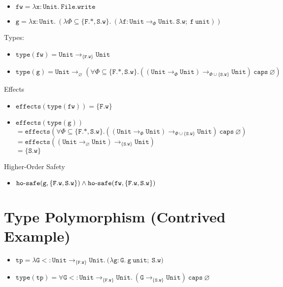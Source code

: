 \documentclass{llncs}
\newcommand{\keywadj}[1]{\mathtt{#1}}
\newcommand{\keyw}[1]{\keywadj{#1}~}
\newcommand{\kw}[1]{\keyw{ #1 }}
\newcommand{\kwa}[1]{\keywadj{ #1 }}
\newcommand{\hyphen}{\hbox{-}}
\newcommand{\Unit}[0]{ \kwa{Unit} }
\newcommand{\fx}[1]{ \kwa{effects}(#1) }
\newcommand{\hosafe}[2]{ \kwa{ho \hyphen safe}(#1, #2) }
\begin{document}
\begin{itemize}
	\item $\kwa{fw = \lambda x: Unit.~File.write}$
	\item $\kwa{g = \lambda x: Unit.~ (\lambda \Phi \subseteq \{F.*, S.w \}.~(\lambda f: Unit \rightarrow_{\Phi} Unit.~S.w;~f~unit))}$
\end{itemize}

\noindent
Types:
\begin{itemize}
	\item $\kwa{type(fw) = \Unit \rightarrow_{\{F.w\}} \Unit}$
	\item $\kwa{type(g) = Unit \rightarrow_{\varnothing} (\forall \Phi \subseteq \{F.*, S.w\}. ((Unit \rightarrow_{\Phi} Unit) \rightarrow_{\Phi \cup \{ \kwa{S.w} \}} Unit) ~\kw{caps} \varnothing)}$
\end{itemize}

\noindent
Effects
\begin{itemize}
	\item $\kwa{effects(type(fw)) = \{F.w\}}$
	\item $\kwa{effects(type(g))}$\\
		$= \fx{\kwa{\forall \Phi \subseteq \{F.*, S.w\}. ((Unit \rightarrow_{\Phi} Unit) \rightarrow_{\Phi \cup \{\kwa{S.w}\}} Unit) ~\kw{caps} \varnothing}}$\\
		$= \fx{\kwa{(Unit \rightarrow_{\varnothing} Unit) \rightarrow_{\{\kwa{S.w}\}} Unit}}$\\
		$= \{ \kwa{S.w}\}$
\end{itemize}

\noindent
Higher-Order Safety
\begin{itemize}
	\item $\hosafe{\kwa{g}}{\{\kwa{F.w,S.w}\}} \land \hosafe{\kwa{fw}}{\{\kwa{F.w,S.w}\}}$
\end{itemize}

\section{Type Polymorphism (Contrived Example)}

\begin{itemize}
	\item $\kwa{tp = \lambda G <: Unit \rightarrow_{\{F.w\}} Unit.~ (\lambda g: G.~g~unit;~S.w})$
	\item $\kwa{type(tp) = \forall G <: Unit \rightarrow_{\{F.w\}} Unit.~(G \rightarrow_{\{S.w\}} Unit)~\kw{caps} \varnothing}$
\end{itemize}
\end{document}
